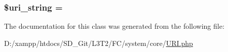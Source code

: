\subsubsection[{\$uri\+\_\+string}]{\setlength{\rightskip}{0pt plus 5cm}\${\bf uri\+\_\+string} = \textquotesingle{}\textquotesingle{}}\label{class_c_i___u_r_i_ab908b3e655463a05e8a646c965ca4e53}


The documentation for this class was generated from the following file\+:\begin{DoxyCompactItemize}
\item 
D\+:/xampp/htdocs/\+S\+D\+\_\+\+Git/\+L3\+T2/\+F\+C/system/core/\hyperlink{system_2core_2_u_r_i_8php}{U\+R\+I.\+php}\end{DoxyCompactItemize}
